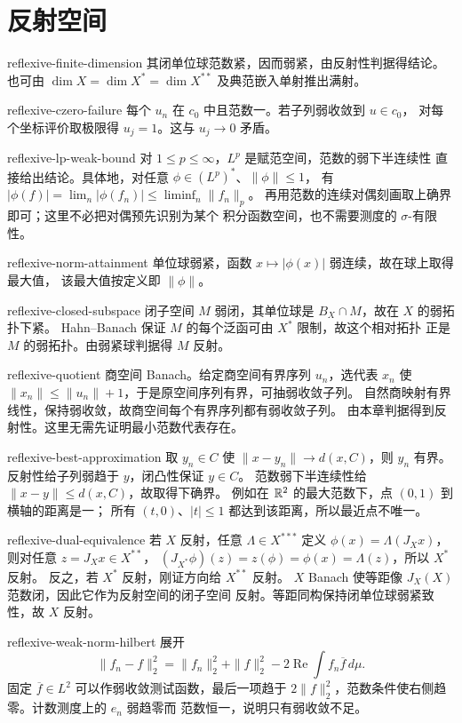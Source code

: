 \chapter{反射空间}
\begin{solution}{reflexive-finite-dimension}
其闭单位球范数紧，因而弱紧，由反射性判据得结论。也可由
\(\dim X=\dim X^*=\dim X^{**}\) 及典范嵌入单射推出满射。
\end{solution}
\begin{solution}{reflexive-czero-failure}
每个 \(u_n\) 在 \(c_0\) 中且范数一。若子列弱收敛到 \(u\in c_0\)，
对每个坐标评价取极限得 \(u_j=1\)。这与 \(u_j\to0\) 矛盾。
\end{solution}
\begin{solution}{reflexive-lp-weak-bound}
对 \(1\le p\le\infty\)，\(L^p\) 是赋范空间，范数的弱下半连续性
直接给出结论。具体地，对任意 \(\phi\in(L^p)^*\)、\(\|\phi\|\le1\)，
有 \(|\phi(f)|=\lim_n|\phi(f_n)|\le\liminf_n\|f_n\|_p\)。
再用范数的连续对偶刻画取上确界即可；这里不必把对偶预先识别为某个
积分函数空间，也不需要测度的 \(\sigma\)-有限性。
\end{solution}
\begin{solution}{reflexive-norm-attainment}
单位球弱紧，函数 \(x\mapsto|\phi(x)|\) 弱连续，故在球上取得最大值，
该最大值按定义即 \(\|\phi\|\)。
\end{solution}
\begin{solution}{reflexive-closed-subspace}
闭子空间 \(M\) 弱闭，其单位球是 \(B_X\cap M\)，故在 \(X\) 的弱拓扑下紧。
Hahn--Banach 保证 \(M\) 的每个泛函可由 \(X^*\) 限制，故这个相对拓扑
正是 \(M\) 的弱拓扑。由弱紧球判据得 \(M\) 反射。
\end{solution}
\begin{solution}{reflexive-quotient}
商空间 Banach。给定商空间有界序列 \(u_n\)，选代表 \(x_n\) 使
\(\|x_n\|\le\|u_n\|+1\)，于是原空间序列有界，可抽弱收敛子列。
自然商映射有界线性，保持弱收敛，故商空间每个有界序列都有弱收敛子列。
由本章判据得到反射性。这里无需先证明最小范数代表存在。
\end{solution}
\begin{solution}{reflexive-best-approximation}
取 \(y_n\in C\) 使 \(\|x-y_n\|\to d(x,C)\)，则 \(y_n\) 有界。
反射性给子列弱趋于 \(y\)，闭凸性保证 \(y\in C\)。
范数弱下半连续性给 \(\|x-y\|\le d(x,C)\)，故取得下确界。
例如在 \(\mathbb{R}^2\) 的最大范数下，点 \((0,1)\) 到横轴的距离是一；
所有 \((t,0)\)、\(|t|\le1\) 都达到该距离，所以最近点不唯一。
\end{solution}
\begin{solution}{reflexive-dual-equivalence}
若 \(X\) 反射，任意 \(\Lambda\in X^{***}\) 定义
\(\phi(x)=\Lambda(J_Xx)\)，则对任意 \(z=J_Xx\in X^{**}\)，
\((J_{X^*}\phi)(z)=z(\phi)=\phi(x)=\Lambda(z)\)，所以 \(X^*\) 反射。
反之，若 \(X^*\) 反射，刚证方向给 \(X^{**}\) 反射。
\(X\) Banach 使等距像 \(J_X(X)\) 范数闭，因此它作为反射空间的闭子空间
反射。等距同构保持闭单位球弱紧致性，故 \(X\) 反射。
\end{solution}
\begin{solution}{reflexive-weak-norm-hilbert}
展开
\[
 \|f_n-f\|_2^2=\|f_n\|_2^2+\|f\|_2^2
       -2\operatorname{Re}\int f_n\overline f\,d\mu.
\]
固定 \(\overline f\in L^2\) 可以作弱收敛测试函数，最后一项趋于
\(2\|f\|_2^2\)，范数条件使右侧趋零。计数测度上的 \(e_n\) 弱趋零而
范数恒一，说明只有弱收敛不足。
\end{solution}

